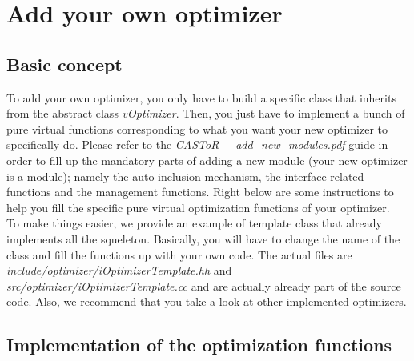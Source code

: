 \documentclass[a4paper, 11pt]{article}
\begin{document}
\section{Add your own optimizer}

\subsection{Basic concept}

To add your own optimizer, you only have to build a specific class that inherits from the abstract class \textit{vOptimizer}.
Then, you just have to implement a bunch of pure virtual functions corresponding to what you want your new optimizer to specifically do.
Please refer to the \textit{CASToR\_\_add\_new\_modules.pdf} guide in order to fill up the mandatory parts of adding a new module (your new optimizer is a module);
namely the auto-inclusion mechanism, the interface-related functions and the management functions.
Right below are some instructions to help you fill the specific pure virtual optimization functions of your optimizer.\\

To make things easier, we provide an example of template class that already implements all the squeleton.
Basically, you will have to change the name of the class and fill the functions up with your own code.
The actual files are \textit{include/optimizer/iOptimizerTemplate.hh} and \textit{src/optimizer/iOptimizerTemplate.cc} and are actually already part of the source code.
Also, we recommend that you take a look at other implemented optimizers.

\subsection{Implementation of the optimization functions}
\end{document}
